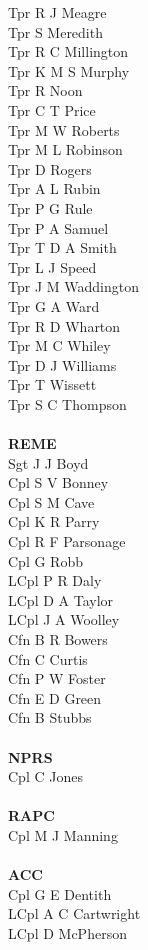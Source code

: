 \begin{multicols}{4}
  Tpr R J Meagre \\
  Tpr S Meredith \\
  Tpr R C Millington \\
  Tpr K M S Murphy \\
  Tpr R Noon \\
  Tpr C T Price \\
  Tpr M W Roberts \\
  Tpr M L Robinson \\
  Tpr D Rogers \\
  Tpr A L Rubin \\
  Tpr P G Rule \\
  Tpr P A Samuel \\
  Tpr T D A Smith \\
  Tpr L J Speed \\
  Tpr J M Waddington \\
  Tpr G A Ward \\
  Tpr R D Wharton \\
  Tpr M C Whiley \\
  Tpr D J Williams \\
  Tpr T Wissett \\
  Tpr S C Thompson \\
  \\
  \textbf{REME} \\
  Sgt J J Boyd \\
  Cpl S V Bonney \\
  Cpl S M Cave \\
  Cpl K R Parry \\
  Cpl R F Parsonage \\
  Cpl G Robb \\
  LCpl P R Daly \\
  LCpl D A Taylor \\
  LCpl J A Woolley \\
  Cfn B R Bowers \\
  Cfn C Curtis \\
  Cfn P W Foster \\
  Cfn E D Green \\
  Cfn B Stubbs \\
  \\
  \textbf{NPRS} \\
  Cpl C Jones \\
  \\
  \textbf{RAPC} \\
  Cpl M J Manning \\
  \\
  \textbf{ACC} \\
  Cpl G E Dentith \\
  LCpl A C Cartwright \\
  LCpl D McPherson
\end{multicols}

\pagebreak
